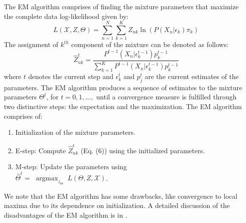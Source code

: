 \documentclass[conference]{IEEEtran}
\DeclareMathOperator*{\argmax}{argmax} %
\begin{document}
The EM algorithm comprises of finding the mixture parameters that maximize the complete data log-likelihood given by:
\begin{equation}
    L(\mathcal{X}, Z, \Theta) = \sum_{n = 1}^{N}\sum_{k=1}^{K} Z_{nk}\ln(P(X_n|\epsilon_k)\pi_k)
\end{equation}
The assignment of $k^{th}$ component of the mixture can be denoted as follows\cite{b9}:
\begin{equation}
    \hat{Z}_{nk}^t = \frac{P^{t-1}(X_n|\epsilon_k^{t-1})p_k^{t-1}}{\sum_{k=1}^{K} P^{t-1}(X_n|\epsilon_k^{t-1}) p_k^{t-1}}
\end{equation}
where $t$ denotes the current step and $\epsilon_k^t$ and $p_j^t$ are the current estimates of the parameters.
The EM algorithm produces a sequence of estimates to the mixture parameters $\Theta^t$, for $t=0,1,...,$ until a convergence measure is fulfilled through two distinctive steps: the expectation and the maximization. The EM algorithm comprises of:
\begin{enumerate}
    \item Initialization of the mixture parameters.
    \item E-step: Compute $\hat{Z}^t_{nk}$ (Eq. (6)) using the initialized
    parameters.
    \item M-step: Update the parameters using \\
        $\hat{\Theta}^t =$ $\argmax_{z_{\Theta}}$ $L(\Theta, Z, \mathcal{X})$.
\end{enumerate}

We note that the EM algorithm has some drawbacks, like convergence to local maxima due to its dependence on initialization. 
A detailed discussion of the disadvantages of the EM algorithm is in \cite{b1}.

\end{document}

